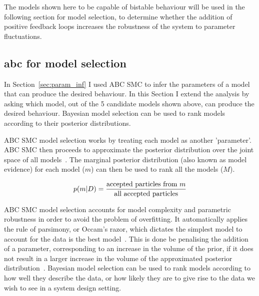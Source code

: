 The models shown here to be capable of bistable behaviour will be used in the following section for model selection, to determine whether the addition of positive feedback loops increases the robustness of the system to parameter fluctuations.



\subsection{\acrshort{abc} for model selection}

In Section~\ref{sec:param_inf} I used ABC SMC to infer the parameters of a model that can produce the desired behaviour. In this Section I extend the analysis by asking which  model, out of the 5 candidate models shown above, can produce the desired behaviour. Bayesian model selection can be used to rank models according to their posterior distributions. 

ABC SMC model selection works by treating each model as another 'parameter'. ABC SMC then proceeds to approximate the posterior distribution over the joint space of all models~\autocite{Toni:2009tr}. The marginal posterior distribution (also known as model evidence) for each model ($m$) can then be used to rank all the models ($M$). 

\begin{align}
	p(m|D) = \frac{\textnormal{accepted particles from } m}{\textnormal{all accepted particles}}
\end{align}

ABC SMC model selection accounts for model complexity and parametric robustness in order to avoid the problem of overfitting. It automatically applies the rule of parsimony, or Occam's razor, which dictates the simplest model to account for the data is the best model~\autocite{Toni:2010}. This is done be penalising the addition of a parameter, corresponding to an increase in the volume of the prior,  if it does not result in a larger increase in the volume of the approximated posterior distribution~\autocite{Woods:2016eh}.  Bayesian model selection can be used to rank models according to how well they describe the data, or how likely they are to give rise to the data we wish to see in a system design setting.  


